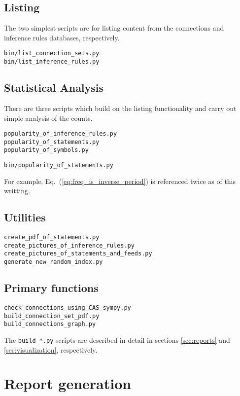\documentclass{article}
\newcommand{\eqn}[1]{Eq.\ (\ref{#1})}
\begin{document}
\begin{multicols}{2}
\subsection{Listing}

The two simplest scripts are for listing content from the connections and inference rules databases, respectively. 
\begin{verbatim}
bin/list_connection_sets.py
bin/list_inference_rules.py
\end{verbatim}

\subsection{Statistical Analysis}
There are three scripts which build on the listing functionality and carry out simple analysis of the counts. 
\begin{verbatim}
popularity_of_inference_rules.py
popularity_of_statements.py
popularity_of_symbols.py
\end{verbatim}

\begin{verbatim}
bin/popularity_of_statements.py
\end{verbatim}
For example, \eqn{eq:freq_is_inverse_period} is referenced twice as of this writting. 

\subsection{Utilities}

\begin{verbatim}
create_pdf_of_statements.py
create_pictures_of_inference_rules.py
create_pictures_of_statements_and_feeds.py
generate_new_random_index.py
\end{verbatim}

\subsection{Primary functions}

\begin{verbatim}
check_connections_using_CAS_sympy.py
build_connection_set_pdf.py
build_connections_graph.py
\end{verbatim}

The \texttt{build\_*.py} scripts are described in detail in sections \ref{sec:reports} and \ref{sec:visualization}, respectively. 

\section{Report generation\label{sec:reports}}


\end{multicols}
\end{document}
